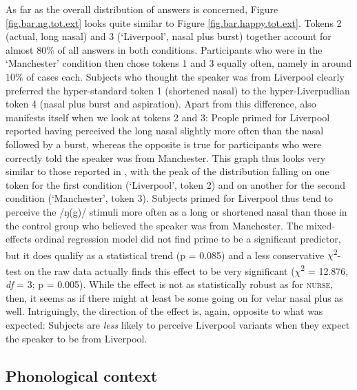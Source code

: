 As far as the overall distribution of answers is concerned, Figure \ref{fig.bar.ng.tot.ext} looks quite similar to Figure \ref{fig.bar.happy.tot.ext}.
Tokens 2 (actual, long nasal) and 3 (`Liverpool', nasal plus burst) together account for almost 80\% of all answers in both conditions.
Participants who were in the `Manchester' condition then chose tokens 1 and 3 equally often, namely in around 10\% of cases each.
Subjects who thought the speaker was from Liverpool clearly preferred the hyper-standard token 1 (shortened nasal) to the hyper-Liverpudlian token 4 (nasal plus burst and aspiration).
Apart from this difference,  also manifests itself when we look at tokens 2 and 3: People primed for Liverpool reported having perceived the long nasal slightly more often than the nasal followed by a burst, whereas the opposite is true for participants who were correctly told the speaker was from Manchester.
This graph thus looks very similar to those reported in \citealt{hayetal2006a, haydrager2010}, with the peak of the distribution falling on one token for the first condition (`Liverpool', token 2) and on another for the second condition (`Manchester', token 3).
Subjects primed for Liverpool thus tend to perceive the /ŋ(g)/ stimuli more often as a long or shortened nasal than those in the control group who believed the speaker was from Manchester.
The mixed-effects ordinal regression model did not find prime to be a significant predictor, but it does qualify as a statistical trend (p = 0.085) and a less conservative \(\chi\)\textsuperscript{2}-test on the raw data actually finds this effect to be very significant (\(\chi\)\textsuperscript{2} = 12.876, \emph{df} = 3; p = 0.005).
While the effect is not as statistically robust as for \textsc{nurse}, then, it seems as if there might at least be some  going on for velar nasal plus as well.
Intriguingly, the direction of the effect is, again, opposite to what was expected: Subjects are \emph{less} likely to perceive Liverpool variants when they expect the speaker to be from Liverpool.

\subsection{Phonological context}
\label{sec.perc_res.ng.phon}

